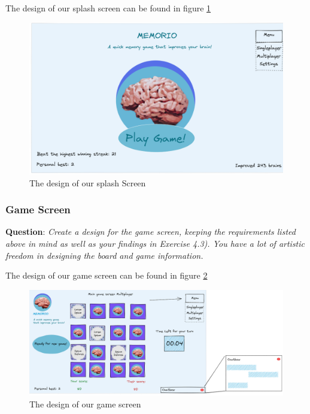 \documentclass{article}
\begin{document}
The design of our splash screen can be found in figure \ref{fig:splash_screen}

\begin{figure}[t]
    \centering
    \includegraphics[width=\textwidth]{splash.png}
    \caption{The design of our splash Screen}
    \label{fig:splash_screen}
\end{figure}

\subsubsection{Game Screen}

\textbf{Question}: \textit{Create a design for the game screen, keeping the requirements listed above in mind as well as your findings in Exercise 4.3). You have a lot of artistic freedom in designing the board and game information.}

The design of our game screen can be found in figure \ref{fig:game_screen}


\begin{figure}[t]
    \centering
    \includegraphics[width=1.0\textwidth]{game.png}
    \caption{The design of our game screen}
    \label{fig:game_screen}
\end{figure}
\end{document}
